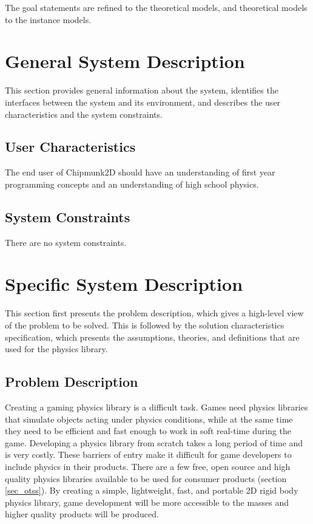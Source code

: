 \documentclass[12pt]{article}
\begin{document}
The goal statements are refined to the theoretical models, and theoretical
models to the instance models.  


%
%

\section{General System Description}

This section provides general information about the system,
identifies the interfaces between the system and its environment, and describes
the user characteristics and the system constraints.

\subsection{User Characteristics}

The end user of Chipmunk2D should have an understanding 
of first year programming concepts and an understanding of high school
physics.

\subsection{System Constraints}

There are no system constraints.


%
%

\section{Specific System Description}

This section first presents the problem description, which gives a high-level
view of the problem to be solved. This is followed by the solution
characteristics specification, which presents the assumptions, theories, 
and definitions that are used for the physics library.

\subsection{Problem Description} \label{Sec_pd}

Creating a gaming physics library is a difficult task. Games need 
physics libraries that simulate objects acting under physics conditions,
while at the same time they need to be efficient and fast enough to
work in soft real-time during the game. Developing a physics library from scratch
takes a long period of time and is very costly. These barriers of entry make it
difficult for game developers to include physics in their products. There are
a few free, open source and high quality physics libraries available to be used
for consumer products (section \ref{sec_otss}). By creating a simple, lightweight, fast, and portable 2D
rigid body physics library, game development will be more accessible to the
masses and higher quality products will be produced.
\end{document}
